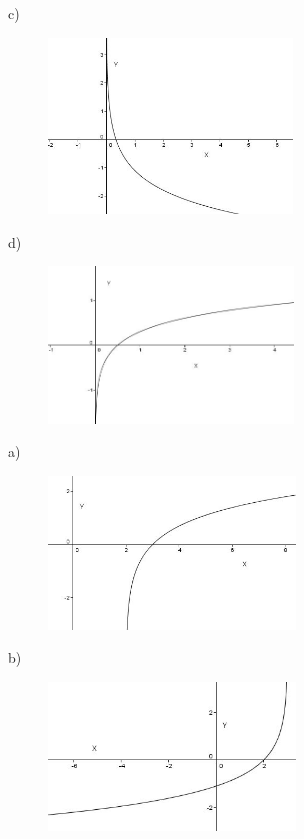 \begin{respostas}{7}
\begin{multicols}{2}
c)
\begin{figure}[H]
	\begin{Center}
		\includegraphics[width=2.55in,height=1.84in]{capitulos/logaritmos_e_funcao_logaritmica/media/image28.JPG}
	\end{Center}
\end{figure}

d)
\begin{figure}[H]
	\begin{Center}
		\includegraphics[width=2.56in,height=1.64in]{capitulos/logaritmos_e_funcao_logaritmica/media/image29.JPG}
	\end{Center}
\end{figure}

    \ansitem{}

a)\begin{figure}[H]
	\begin{Center}
		\includegraphics[width=2.58in,height=1.6in]{capitulos/logaritmos_e_funcao_logaritmica/media/image30.JPG}
	\end{Center}
\end{figure}

b)\begin{figure}[H]
	\begin{Center}
		\includegraphics[width=2.58in,height=1.55in]{capitulos/logaritmos_e_funcao_logaritmica/media/image31.JPG}
	\end{Center}
\end{figure}


\end{multicols}
\end{respostas}
